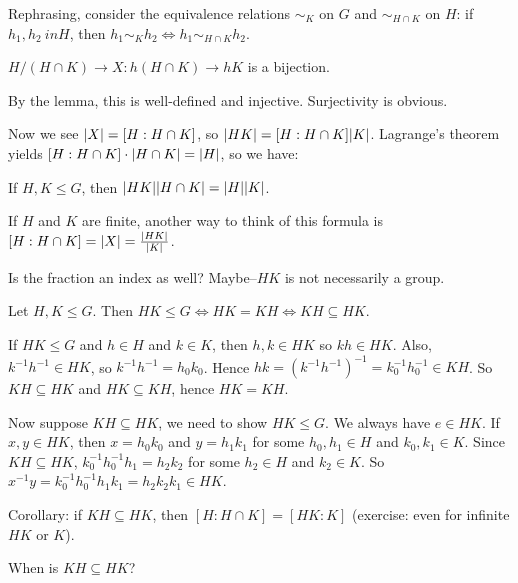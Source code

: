 \documentclass[12pt,letterpaper]{report}
\begin{document}
Rephrasing, consider the equivalence relations $\sim_K$ on $G$ and $\sim_{H \cap K}$ on $H$:
if $h_1, h_2\ in H$, then $h_1 \sim_K h_2 \iff h_1 \sim_{H \cap K} h_2$.

\begin{cor}{}{}
  $H/(H \cap K) \to X \colon h(H \cap K) \to hK$ is a bijection.
\end{cor}

\begin{thmproof}
  By the lemma, this is well-defined and injective.
  Surjectivity is obvious.
\end{thmproof}

Now we see $\lvert X\rvert = [H : H \cap K]$, so $\lvert HK\rvert = [H : H \cap K] \lvert K\rvert$.
Lagrange's theorem yields $[H : H \cap K] \cdot \lvert H \cap K\rvert = \lvert H\rvert$, so we have:

\begin{prop}{}{}
  If $H, K \leq G$, then $\lvert HK\rvert\lvert H \cap K\rvert = \lvert H\rvert\lvert K\rvert$.
\end{prop}

If $H$ and $K$ are finite, another way to think of this formula is
$[H : H \cap K] = \lvert X\rvert = \frac{\lvert HK\rvert}{\lvert K\rvert}$.

Is the fraction an index as well?
Maybe--$HK$ is not necessarily a group.

\begin{prop}{}{}
  Let $H, K \leq G$.
  Then $HK \leq G \iff HK = KH \iff KH \subseteq HK$.
\end{prop}

\begin{thmproof}
  If $HK \leq G$ and $h \in H$ and $k \in K$, then $h, k \in HK$ so $kh \in HK$.
  Also, $k^{-1}h^{-1} \in HK$, so $k^{-1}h^{-1} = h_0k_0$.
  Hence $hk = (k^{-1}h^{-1})^{-1} = k_0^{-1}h_0^{-1} \in KH$.
  So $KH \subseteq HK$ and $HK \subseteq KH$, hence $HK = KH$.

  Now suppose $KH \subseteq HK$, we need to show $HK \leq G$.
  We always have $e \in HK$.
  If $x, y \in HK$, then $x = h_0k_0$ and $y = h_1k_1$ for some $h_0, h_1 \in H$ and
  $k_0, k_1 \in K$.
  Since $KH \subseteq HK$, $k_0^{-1}h_0^{-1}h_1 = h_2k_2$ for some $h_2 \in H$ and $k_2 \in K$.
  So $x^{-1}y = k_0^{-1}h_0^{-1}h_1k_1 = h_2k_2k_1 \in HK$.
\end{thmproof}

Corollary: if $KH \subseteq HK$, then $[H : H \cap K] = [HK : K]$ (exercise: even for infinite
$HK$ or $K$).

When is $KH \subseteq HK$?
\end{document}
